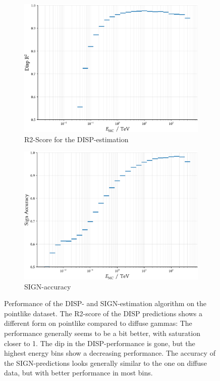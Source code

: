 \begin{figure}
    \centering
    \captionsetup{width=0.9\linewidth}
    \begin{subfigure}{0.45\textwidth}
        \includegraphics[width=\linewidth]{../analysis/plots/disp_gamma_r2_equal_sized.pdf} 
        \caption{R2-Score for the DISP-estimation}
    \end{subfigure}
    \begin{subfigure}{0.45\textwidth}
        \includegraphics[width=\linewidth]{../analysis/plots/disp_gamma_acc_equal_sized.pdf}
        \caption{SIGN-accuracy}
    \end{subfigure}
    \caption{
	Performance of the DISP- and SIGN-estimation algorithm on the pointlike dataset.
    The R2-score of the DISP predictions shows a different form on pointlike
	compared to diffuse gammas: The performance generally seems to be a bit better, 
	with saturation closer to 1. The dip in the DISP-performance is gone, but the highest energy bins
	show a decreasing performance.
    The accuracy of the SIGN-predictions looks generally similar to the one on diffuse data,
    but with better performance in most bins.}
    \label{fig:disp_gamma_perf}
\end{figure}

